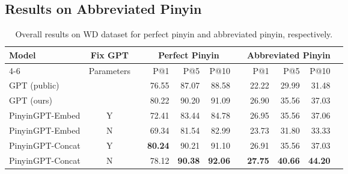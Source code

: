 \subsection{Results on Abbreviated Pinyin}


\begin{table*}[t]
\centering
\begin{tabular}{lcrrrrrrrrr}\toprule
\multirow{3}{*}{Model} &\multirow{2}{*}{Fix GPT} & &\multicolumn{3}{c}{Perfect Pinyin} & &\multicolumn{3}{c}{Abbreviated Pinyin} \\\cmidrule{4-6}\cmidrule{8-10}
& Parameters& &P@1 &P@5 &P@10 & &P@1 &P@5 &P@10 \\\midrule
GPT (public) & & &76.55 &87.07 &88.58 & &22.22 &29.99 &31.48 \\
GPT (ours) & & &80.22 &90.20 &91.09 & &26.90 &35.56 &37.03 \\\midrule
PinyinGPT-Embed &Y & &72.41 &83.44 &84.78 & &26.95 &35.56 &37.06 \\
PinyinGPT-Embed &N & &69.34 &81.54 &82.99 & &23.73 &31.80 &33.33 \\
PinyinGPT-Concat &Y & &\textbf{80.24} &90.21 &91.10 & &26.91 &35.56 &37.03 \\
PinyinGPT-Concat &N & &78.12 &\textbf{90.38} &\textbf{92.06} & &\textbf{27.75} &\textbf{40.66} &\textbf{44.20} \\
\bottomrule
\end{tabular}
\caption{Overall results on WD dataset
for perfect pinyin and  abbreviated pinyin, respectively.}
\label{tab:wd}
\end{table*}







